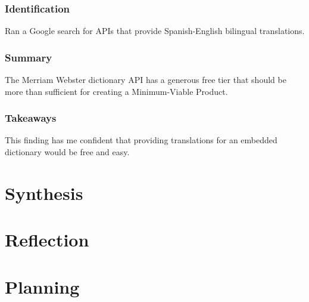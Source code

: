 \documentclass[
	letterpaper, %
]{jdf}
\begin{document}
\subsubsection{Identification}
Ran a Google search for APIs that provide Spanish-English bilingual translations.
\subsubsection{Summary}
The Merriam Webster dictionary API has a generous free tier that should be more than sufficient for creating a Minimum-Viable Product.

\subsubsection{Takeaways}
This finding has me confident that providing translations for an embedded dictionary would be free and easy.

\section{Synthesis}



\section{Reflection}


\section{Planning}


\printbibliography{}
\end{document}
